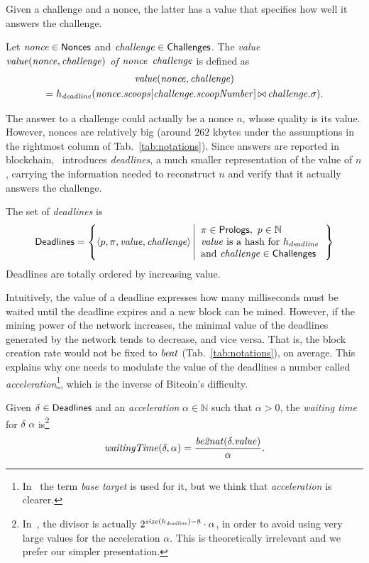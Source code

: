 Given a challenge and a nonce, the latter has a value that specifies how well
it answers the challenge.
%
\begin{definition}\label{def:nonce_value}
  Let ${\mathit{nonce}}\in{\mathsf{Nonces}}$ and ${\mathit{challenge}}\in{\mathsf{Challenges}}$.
  The \emph{value $\mathit{value}({\mathit{nonce}},{\mathit{challenge}})$ of ${\mathit{nonce}}$ \wrt ${\mathit{challenge}}$} is defined as
  \begin{multline*}
    \mathit{value}({\mathit{nonce}},{\mathit{challenge}})\\
    =h_{\mathit{deadline}}({\mathit{nonce}}.{\mathit{scoops}}[{\mathit{challenge}}.{\mathit{scoopNumber}}]\operatorname*{\bowtie}{\mathit{challenge}}.\sigma).
  \end{multline*}
\end{definition}
%
The answer to a challenge could actually be a nonce $n$, whose quality is its value.
However, nonces are relatively big (around $262$ kbytes under the assumptions in the
rightmost column of Tab.~\ref{tab:notations}). Since answers are reported in blockchain,
\cite{SignumPlotting}~introduces \emph{deadlines}, a much smaller representation of the value of
$n$, carrying the information needed to reconstruct $n$ and verify that it actually
answers the challenge.
%
\begin{definition}[Deadline]\label{def:deadline}
  The set of \emph{deadlines} is
  \[
  {\mathsf{Deadlines}}=\left\{
  \langle p,\pi,\mathit{value},{\mathit{challenge}}\rangle
  \left|\begin{array}{l}
  \pi\in{\mathsf{Prologs}},\ p\in\mathbb{N}\\
  \mathit{value}\text{ is a hash for }h_{\mathit{deadline}}\\
  \text{and }{\mathit{challenge}}\in{\mathsf{Challenges}}
  \end{array}
  \right.
  \right\}
  \]
  Deadlines are totally ordered by increasing value.
\end{definition}
%
Intuitively, the value of a deadline expresses how many milliseconds
must be waited until the deadline expires and a new block can be mined.
However, if the mining power of the network increases, the minimal value of the deadlines
generated by the network
tends to decrease, and vice versa. That is, the block creation rate would not be
fixed to ${\mathit{beat}}$ (Tab.~\ref{tab:notations}), on average.
This explains why one needs to modulate the value of the deadlines \wrt a number
called \emph{acceleration}\footnote{In~\cite{SignumPlotting} the term
\emph{base target} is used for it, but we think that \emph{acceleration} is clearer.},
which is the inverse of Bitcoin's difficulty.
%
\begin{definition}\label{def:deadline_waiting_time}
  Given $\delta\in{\mathsf{Deadlines}}$ and an \emph{acceleration}
  $\alpha\in\mathbb{N}$ such that $\alpha>0$, the
  \emph{waiting time} for $\delta$ \wrt $\alpha$ is\footnote{
  In~\cite{SignumPlotting}, the divisor is actually
  $2^{{\mathit{size}}(h_{\mathit{deadline}})-8}\cdot\alpha$, in order to avoid using very large values for the
  acceleration $\alpha$. This is theoretically irrelevant
  and we prefer our simpler presentation.
  }
  \[
  {\mathit{waitingTime}}(\delta,\alpha)
  =\frac{{\mathit{be2nat}}(\delta.\mathit{value})}{\alpha}.
  \]
\end{definition}
